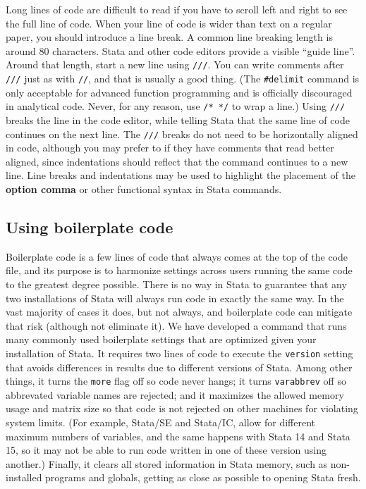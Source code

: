 Long lines of code are difficult to read if you have to scroll left and right to see the full line of code.
When your line of code is wider than text on a regular paper, you should introduce a line break.
A common line breaking length is around 80 characters.
Stata and other code editors provide a visible ``guide line''.
Around that length, start a new line using \texttt{///}.
You can write comments after \texttt{///} just as with \texttt{//}, and that is usually a good thing.
(The \texttt{\#delimit} command is only acceptable for advanced function programming
and is officially discouraged in analytical code.\cite{cox2005styleguide}
Never, for any reason, use \texttt{/* */} to wrap a line.)
Using \texttt{///} breaks the line in the code editor,
while telling Stata that the same line of code continues on the next line.
The \texttt{///} breaks do not need to be horizontally aligned in code,
although you may prefer to if they have comments that read better aligned,
since indentations should reflect that the command continues to a new line.
Line breaks and indentations may be used to highlight the placement
of the \textbf{option comma} or other functional syntax in Stata commands.


\subsection{Using boilerplate code}

Boilerplate code is a few lines of code that always comes at the top of the code file,
and its purpose is to harmonize settings across users running the same code to the greatest degree possible. There is no way in Stata to guarantee that any two installations of Stata
will always run code in exactly the same way.
In the vast majority of cases it does, but not always,
and boilerplate code can mitigate that risk (although not eliminate it).
We have developed a command that runs many commonly used boilerplate settings
that are optimized given your installation of Stata.
It requires two lines of code to execute the \texttt{version}
setting that avoids differences in results due to different versions of Stata.
Among other things, it turns the \texttt{more} flag off so code never hangs;
it turns \texttt{varabbrev} off so abbrevated variable names are rejected;
and it maximizes the allowed memory usage and matrix size
so that code is not rejected on other machines for violating system limits.
(For example, Stata/SE and Stata/IC, allow for different maximum numbers of variables,
and the same happens with Stata 14 and Stata 15,
so it may not be able to run code written in one of these version using another.)
Finally, it clears all stored information in Stata memory,
such as non-installed programs and globals,
getting as close as possible to opening Stata fresh.

